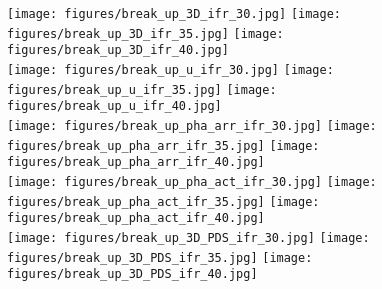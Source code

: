 \documentclass{article}
\newcommand{\figbreakup}{2.5cm}
\begin{document}
\begin{figure}
    \centering
{} 
\texttt{[image: figures/break\_up\_3D\_ifr\_30.jpg]}
\texttt{[image: figures/break\_up\_3D\_ifr\_35.jpg]}
\texttt{[image: figures/break\_up\_3D\_ifr\_40.jpg]}
\\ 
\texttt{[image: figures/break\_up\_u\_ifr\_30.jpg]}
\texttt{[image: figures/break\_up\_u\_ifr\_35.jpg]}
\texttt{[image: figures/break\_up\_u\_ifr\_40.jpg]}
\\
\texttt{[image: figures/break\_up\_pha\_arr\_ifr\_30.jpg]}
\texttt{[image: figures/break\_up\_pha\_arr\_ifr\_35.jpg]}
\texttt{[image: figures/break\_up\_pha\_arr\_ifr\_40.jpg]}
\\ 
\texttt{[image: figures/break\_up\_pha\_act\_ifr\_30.jpg]}
\texttt{[image: figures/break\_up\_pha\_act\_ifr\_35.jpg]}
\texttt{[image: figures/break\_up\_pha\_act\_ifr\_40.jpg]}
\\
\texttt{[image: figures/break\_up\_3D\_PDS\_ifr\_30.jpg]}
\hspace{0.3cm}
\texttt{[image: figures/break\_up\_3D\_PDS\_ifr\_35.jpg]}
\hspace{0.3cm}
\texttt{[image: figures/break\_up\_3D\_PDS\_ifr\_40.jpg]}
       
  

\end{figure}
\end{document}
